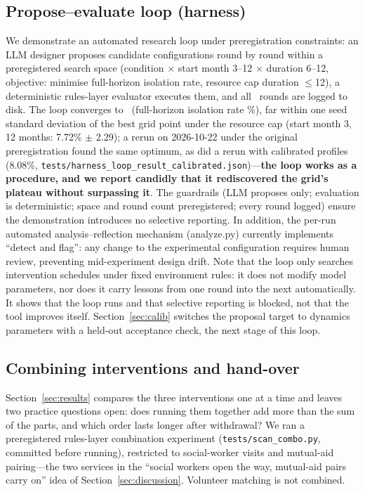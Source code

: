 \documentclass[10pt,twocolumn]{article}
\begin{document}
\subsection{Propose--evaluate loop (harness)}\label{sec:harness}
We demonstrate an automated research loop under preregistration constraints: an LLM designer proposes candidate configurations round by round within a preregistered search space (condition $\times$ start month 3--12 $\times$ duration 6--12, objective: minimise full-horizon isolation rate, resource cap duration $\le$12), a deterministic rules-layer evaluator executes them, and all \LoopIters\ rounds are logged to disk. The loop converges to \LoopBestDesc\ (full-horizon isolation rate \LoopBestScore\%), far within one seed standard deviation of the best grid point under the resource cap (start month 3, 12 months: 7.72\% $\pm$ 2.29); a rerun on 2026-10-22 under the original preregistration found the same optimum, as did a rerun with calibrated profiles (8.08\%, \texttt{tests/harness\_loop\_result\_calibrated.json})---\textbf{the loop works as a procedure, and we report candidly that it rediscovered the grid's plateau without surpassing it}. The guardrails (LLM proposes only; evaluation is deterministic; space and round count preregistered; every round logged) ensure the demonstration introduces no selective reporting. In addition, the per-run automated analysis--reflection mechanism (analyze.py) currently implements ``detect and flag'': any change to the experimental configuration requires human review, preventing mid-experiment design drift. Note that the loop only searches intervention schedules under fixed environment rules: it does not modify model parameters, nor does it carry lessons from one round into the next automatically. It shows that the loop runs and that selective reporting is blocked, not that the tool improves itself. Section~\ref{sec:calib} switches the proposal target to dynamics parameters with a held-out acceptance check, the next stage of this loop.

\subsection{Combining interventions and hand-over}\label{sec:combo}
Section~\ref{sec:results} compares the three interventions one at a time and leaves two practice questions open: does running them together add more than the sum of the parts, and which order lasts longer after withdrawal? We ran a preregistered rules-layer combination experiment (\texttt{tests/scan\_combo.py}, committed before running), restricted to social-worker visits and mutual-aid pairing---the two services in the ``social workers open the way, mutual-aid pairs carry on'' idea of Section~\ref{sec:discussion}. Volunteer matching is not combined.
\end{document}
